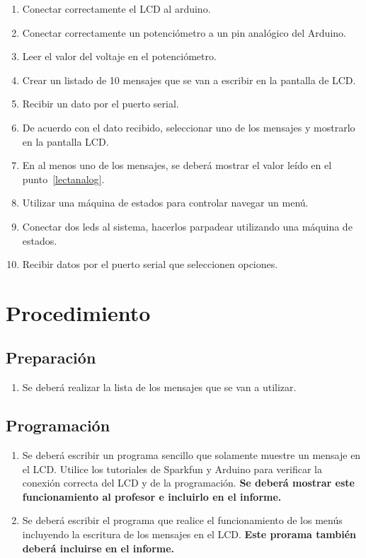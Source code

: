 \documentclass[12pt,letterpaper]{IEEEtran}
\begin{document}
\begin{enumerate}
	\item Conectar correctamente el LCD al arduino.
	\item Conectar correctamente un potenciómetro a un pin analógico del Arduino.
	\item Leer el valor del voltaje en el potenciómetro.\label{lectanalog}
	\item Crear un listado de 10 mensajes que se van a escribir en la pantalla de LCD.
	\item Recibir un dato por el puerto serial.
	\item De acuerdo con el dato recibido, seleccionar uno de los mensajes y mostrarlo en la pantalla LCD.
	\item En al menos uno de los mensajes, se deberá mostrar el valor leído en el punto~\ref{lectanalog}.
	\item Utilizar una máquina de estados para controlar navegar un menú.
	\item Conectar dos leds al sistema, hacerlos parpadear utilizando una máquina de estados.
	\item Recibir datos por el puerto serial que seleccionen opciones. 
\end{enumerate}

\section{Procedimiento}


\subsection{Preparación}

\begin{enumerate}
	\item Se deberá realizar la lista de los mensajes que se van a utilizar.
\end{enumerate}


\subsection{Programación}

\begin{enumerate}[resume]
    \item Se deberá escribir un programa sencillo que solamente muestre un mensaje en el LCD. Utilice los tutoriales de Sparkfun y Arduino para verificar la conexión correcta del LCD y de la programación. \textbf{Se deberá mostrar este funcionamiento al profesor e incluirlo en el informe.}
    \item Se deberá escribir el programa que realice el funcionamiento de los menús incluyendo la escritura de los mensajes en el LCD. \textbf{Este prorama también deberá incluirse en el informe.}
\end{enumerate}
\end{document}
